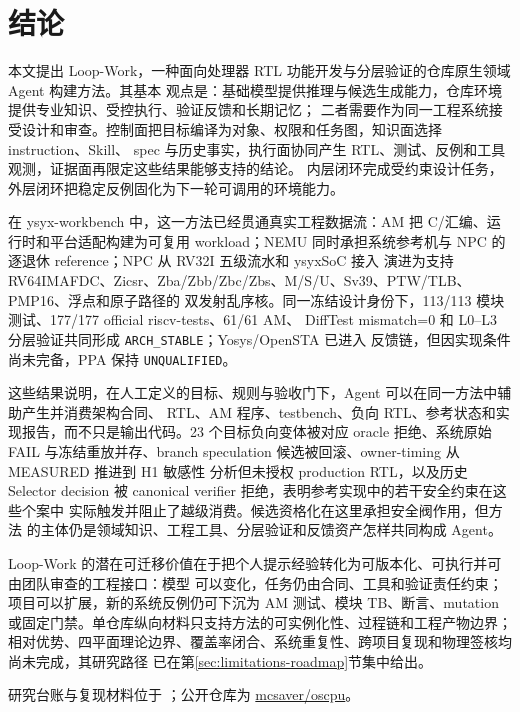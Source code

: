 \documentclass[UTF8,a4paper,zihao=-4,oneside]{ctexart}
\newcommand{\taskpath}[1]{\path{#1}}
\newcommand{\statusword}[1]{\texttt{#1}}
\begin{document}
\section{结论}

本文提出 Loop-Work，一种面向处理器 RTL 功能开发与分层验证的仓库原生领域 Agent 构建方法。其基本
观点是：基础模型提供推理与候选生成能力，仓库环境提供专业知识、受控执行、验证反馈和长期记忆；
二者需要作为同一工程系统接受设计和审查。控制面把目标编译为对象、权限和任务图，知识面选择 instruction、Skill、
spec 与历史事实，执行面协同产生 RTL、测试、反例和工具观测，证据面再限定这些结果能够支持的结论。
内层闭环完成受约束设计任务，外层闭环把稳定反例固化为下一轮可调用的环境能力。

在 ysyx-workbench 中，这一方法已经贯通真实工程数据流：AM 把 C/汇编、运行时和平台适配构建为可复用
workload；NEMU 同时承担系统参考机与 NPC 的逐退休 reference；NPC 从 RV32I 五级流水和 ysyxSoC 接入
演进为支持 RV64IMAFDC、Zicsr、Zba/Zbb/Zbc/Zbs、M/S/U、Sv39、PTW/TLB、PMP16、浮点和原子路径的
双发射乱序核。同一冻结设计身份下，113/113 模块测试、177/177 official riscv-tests、61/61 AM、
DiffTest mismatch=0 和 L0--L3 分层验证共同形成 \statusword{ARCH\_STABLE}；Yosys/OpenSTA 已进入
反馈链，但因实现条件尚未完备，PPA 保持 \statusword{UNQUALIFIED}。

这些结果说明，在人工定义的目标、规则与验收门下，Agent 可以在同一方法中辅助产生并消费架构合同、
RTL、AM 程序、testbench、负向 RTL、参考状态和实现报告，而不只是输出代码。23 个目标负向变体被对应 oracle 拒绝、系统原始
FAIL 与冻结重放并存、branch speculation 候选被回滚、owner-timing 从 MEASURED 推进到 H1 敏感性
分析但未授权 production RTL，以及历史 Selector decision 被 canonical verifier 拒绝，表明参考实现中的若干安全约束在这些个案中
实际触发并阻止了越级消费。候选资格化在这里承担安全阀作用，但方法
的主体仍是领域知识、工程工具、分层验证和反馈资产怎样共同构成 Agent。

Loop-Work 的潜在可迁移价值在于把个人提示经验转化为可版本化、可执行并可由团队审查的工程接口：模型
可以变化，任务仍由合同、工具和验证责任约束；项目可以扩展，新的系统反例仍可下沉为 AM 测试、模块
TB、断言、mutation 或固定门禁。单仓库纵向材料只支持方法的可实例化性、过程链和工程产物边界；
相对优势、四平面理论边界、覆盖率闭合、系统重复性、跨项目复现和物理签核均尚未完成，其研究路径
已在第\ref{sec:limitations-roadmap}节集中给出。

研究台账与复现材料位于 \taskpath{docs/research-paper/}；公开仓库为
\href{https://github.com/mcsaver/oscpu}{mcsaver/oscpu}。
\end{document}
